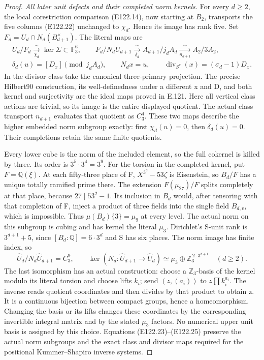 \begin{proof}
\emph{All later unit defects and their completed norm kernels.}
For every $d\ge2$, the local corestriction comparison (E122.14),
now starting at $B_2$, transports the five columns (E122.22)
unchanged to $\chi_d$. Hence its image has rank five. Set
$F_d=U_d\cap N_d(B_{d+1}^{\times})$. The literal maps are
\[
 \begin{gathered}
 U_d/F_d\xrightarrow[\chi_d]{\sim}\ker\Sigma\subset\mathbb F_3^6,
 \qquad
 F_d/N_dU_{d+1}\xrightarrow[\delta_d]{\sim}
       A_{d+1}/j_dA_d\xrightarrow[n_{d+1}]{\sim}A_2/3A_2,\\
 \delta_d(u)=[D_x]\pmod{j_dA_d},\qquad
 N_dx=u,\qquad
 \operatorname{div}_{\!S^c}(x)=(\sigma_d-1)D_x.
 \end{gathered}
 \tag{E122.24}
\]
In the divisor class take the canonical three-primary projection.
The precise Hilbert90 construction, its well-definedness under a
different x and D, and both kernel and surjectivity are the ideal
maps proved in E.121. Here all vertical class actions are trivial,
so its image is the entire displayed quotient. The actual class
transport $n_{d+1}$ evaluates that quotient as $C_3^4$.
These two maps describe the higher embedded norm subgroup exactly:
first $\chi_d(u)=0$, then $\delta_d(u)=0$.
Their completions retain the same finite quotients.

Every lower cube is the norm of the included element, so the full
cokernel is killed by three. Its order is $3^5\cdot3^4=3^9$.
For the torsion in the completed kernel, put $F=\mathbb Q(\xi)$.
At each fifty-three place of F, $X^{3^d}-53\zeta$ is Eisenstein,
so $B_d/F$ has a unique totally ramified prime there.
The extension $F(\mu_{27})/F$ splits completely at that place,
because $27\mid53^2-1$. Its inclusion in $B_d$ would, after tensoring
with that completion of F, inject a product of three fields into
the single field $B_{d,v}$, which is impossible. Thus
$\mu(B_d)\{3\}=\mu_9$ at every level. The actual norm on this
subgroup is cubing and has kernel the literal $\mu_3$.
Dirichlet's S-unit rank is $3^{d+1}+5$, since $[B_d:\mathbb Q]=6\cdot3^d$
and S has six places. The norm image has finite index, so
\[
 \widehat U_d/N_d\widehat U_{d+1}=C_3^9,\qquad
 \ker(N_d:\widehat U_{d+1}\to\widehat U_d)
       \simeq\mu_3\oplus\mathbb Z_3^{\,2\cdot3^{d+1}}
       \quad(d\ge2).
 \tag{E122.25}
\]
The last isomorphism has an actual construction: choose a
$\mathbb Z_3$-basis of the kernel modulo its literal torsion and
choose lifts $k_i$; send $(z,(a_i))$ to $z\prod k_i^{a_i}$.
The inverse reads quotient coordinates and then divides by that
product to obtain z. It is a continuous bijection between compact
groups, hence a homeomorphism. Changing the basis or its lifts
changes these coordinates by the corresponding invertible integral
matrix and by the stated $\mu_3$ factors. No numerical upper unit
basis is assigned by this choice. Equations (E122.23)--(E122.25)
preserve the actual norm subgroups and the exact class and divisor
maps required for the positional Kummer--Shapiro inverse systems.
\end{proof}
